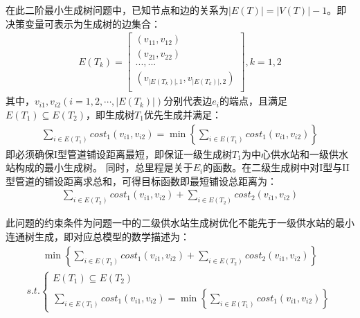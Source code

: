 \documentclass{whutmod}
\begin{document}
		
		
		
			在此二阶最小生成树问题中，已知节点和边的关系为$|E(T)|=|V(T)|-1 $。即决策变量可表示为生成树的边集合：
			\begin{gather}
			E(T_k)=
			\begin{bmatrix}
			(v_{11} ,v_{12}) \\ 
			(v_{21} ,v_{22} )\\ 
			...,...\\
			(v_{|E(T_k)|,1},v_{|E(T_k)|,2})\\
			\end{bmatrix},k=1,2
			\end{gather}
			其中，$v_{i1}, v_{i2}(i =1,2,\cdots,|E(T_k)|)$分别代表边$e_i$的端点，且满足$E(T_1)\subseteq E(T_2)$，即生成树$T_1$优先生成并满足：
			\begin{gather}
			\sum_{i\in E(T_1) }cost_1(v_{i1},v_{i2})=\min\left \{ 	\sum_{i\in E(T_1) }cost_1(v_{i1},v_{i2}) \right \}
			\end{gather}
			即必须确保I型管道铺设距离最短，即保证一级生成树$T_1$为中心供水站和一级供水站构成的最小生成树。
			 同时，总里程是关于$E_{i}$的函数。在二级生成树中对I型与II型管道的铺设距离求总和，可得目标函数即最短铺设总距离为：
			\begin{gather}
	         	\sum_{i\in E(T_2) }cost_1(v_{i1},v_{i2})+\sum_{i\in E(T_2) }cost_2(v_{i1},v_{i2})
			\end{gather}
			
			此问题的约束条件为问题一中的二级供水站生成树优化不能先于一级供水站的最小连通树生成，即对应总模型的数学描述为：
			\begin{gather}
			\min \left\{ \sum_{i\in E(T_2) }cost_1(v_{i1},v_{i2})+\sum_{i\in E(T_2) }cost_2(v_{i1},v_{i2}) \right \}
			\end{gather}
			\begin{gather*}
			s.t.\left\{\begin{matrix}
			E(T_{1})\subseteq  E(T_{2})\\ 
			\displaystyle	\sum_{i\in E(T_1) }cost_1(v_{i1},v_{i2})=\min\left \{ \displaystyle	\sum_{i\in E(T_1) }cost_1(v_{i1},v_{i2}) \right \} 
						\end{matrix}\right.
			\end{gather*}
\end{document}
